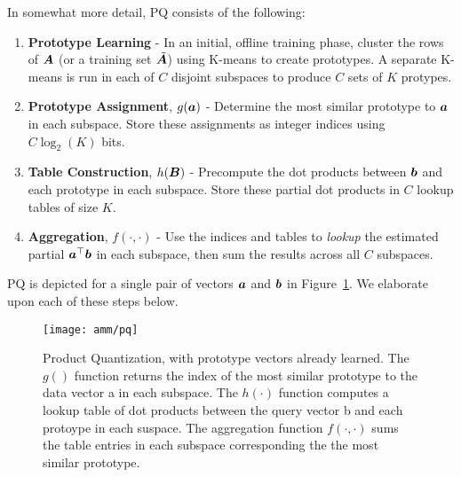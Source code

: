 In somewhat more detail, PQ consists of the following:
\begin{enumerate}
    \item \textbf{Prototype Learning} - In an initial, offline training phase,  cluster the rows of $\bm{A}$ (or a training set $\tilde{\bm{A}}$) using K-means to create prototypes. A separate K-means is run in each of $C$ disjoint subspaces to produce $C$ sets of $K$ protypes. %
    \item \textbf{Prototype Assignment}, $g(\bm{a})$ - Determine the most similar prototype to $\bm{a}$ in each subspace. Store these assignments as integer indices using $C \log_2(K)$ bits.
    \item \textbf{Table Construction}, $h(\bm{B})$ - Precompute the dot products between $\bm{b}$ and each prototype in each subspace. Store these partial dot products in $C$ lookup tables of size $K$.
    \item \textbf{Aggregation}, $f(\cdot,\cdot)$ - Use the indices and tables to \textit{lookup} the estimated partial $\bm{a}^\top \bm{b}$ in each subspace, then sum the results across all $C$ subspaces. %
\end{enumerate}

PQ is depicted for a single pair of vectors $\bm{a}$ and $\bm{b}$ in Figure~\ref{fig:pq}. We elaborate upon each of these steps below.

\begin{figure}[h]
\begin{center}
\texttt{[image: amm/pq]}
\caption{Product Quantization, with prototype vectors already learned. The $g()$ function returns the index of the most similar prototype to the data vector a in each subspace. The $h(\cdot)$ function computes a lookup table of dot products between the query vector b and each protoype in each suspace. The aggregation function $f(\cdot,\cdot)$ sums the table entries in each subspace corresponding the the most similar prototype.}
\label{fig:pq}
\end{center}
\end{figure}

